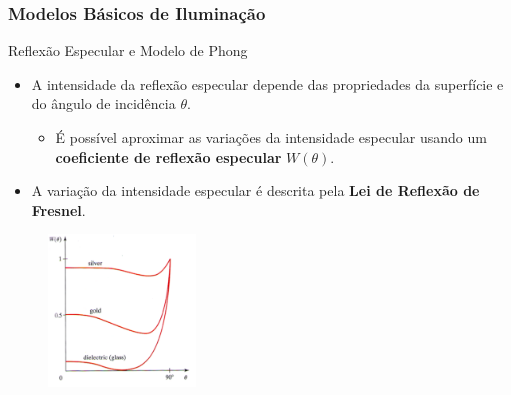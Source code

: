 \documentclass{beamer}
\begin{document}
\begin{frame}
\frametitle{Modelos Básicos de Iluminação}

	\begin{block}{Reflexão Especular e Modelo de Phong}
		\begin{itemize}
			\item A intensidade da reflexão especular depende das propriedades da superfície e do ângulo de incidência $\theta$.
				\begin{itemize}
					\item É possível aproximar as variações da intensidade especular usando um \textbf{coeficiente de reflexão especular} $W(\theta)$.
				\end{itemize}
				\item A variação da intensidade especular é descrita pela \textbf{Lei de Reflexão de Fresnel}.
		\end{itemize}
	\end{block}
	
	\begin{figure}[!h]
		\begin{center}
		\includegraphics[width=0.35\textwidth]{Figures/Fres}
		\end{center}
	\end{figure}	
\end{frame}
\end{document}
